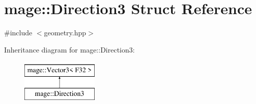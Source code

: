 \hypertarget{structmage_1_1_direction3}{}\section{mage\+:\+:Direction3 Struct Reference}
\label{structmage_1_1_direction3}


{\ttfamily \#include $<$geometry.\+hpp$>$}

Inheritance diagram for mage\+:\+:Direction3\+:\begin{figure}[H]
\begin{center}
\leavevmode
\includegraphics[height=2.000000cm]{structmage_1_1_direction3}
\end{center}
\end{figure}
